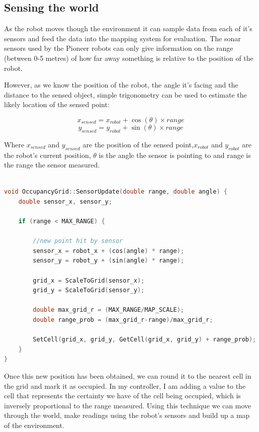 \documentclass{article}
\begin{document}
\subsection{Sensing the world}
As the robot moves though the environment it can sample data from each of it's sensors and feed the data into the mapping system for evaluation. The sonar sensors used by the Pioneer robots can only give information on the range (between 0-5 metres) of how far away something is relative to the position of the robot.

However, as we know the position of the robot, the angle it's facing and the distance to the sensed object, simple trigonometry can be used to estimate the likely location of the sensed point:

\[ x_{sensed} = x_{robot} + \cos (\theta) \times range \]
\[ y_{sensed} = y_{robot} + \sin (\theta) \times range \]

Where $x_{sensed}$ and $y_{sensed}$ are the position of the sensed point,$x_{robot}$ and $y_{robot}$ are the robot's current position, $\theta$ is the angle the sensor is pointing to and range is the range the sensor measured.

\begin{center}
	\begin{lstlisting}[language=c++, showstringspaces=false, caption={C++ code used for calculating the new point given the current position, angle and range}]

void OccupancyGrid::SensorUpdate(double range, double angle) {
	double sensor_x, sensor_y;

	if (range < MAX_RANGE) {

		//new point hit by sensor
		sensor_x = robot_x + (cos(angle) * range);
		sensor_y = robot_y + (sin(angle) * range);

		grid_x = ScaleToGrid(sensor_x);
		grid_y = ScaleToGrid(sensor_y);

		double max_grid_r = (MAX_RANGE/MAP_SCALE);
		double range_prob = (max_grid_r-range)/max_grid_r;

		SetCell(grid_x, grid_y, GetCell(grid_x, grid_y) + range_prob);
	}
}

	\end{lstlisting}
\end{center}

Once this new position has been obtained, we can round it to the nearest cell in the grid and mark it as occupied. In my controller, I am adding a value to the cell that represents the certainty we have of the cell being occupied, which is inversely proportional to the range measured. Using this technique we can move through the world, make readings using the robot's sensors and build up a map of the environment.
\end{document}
